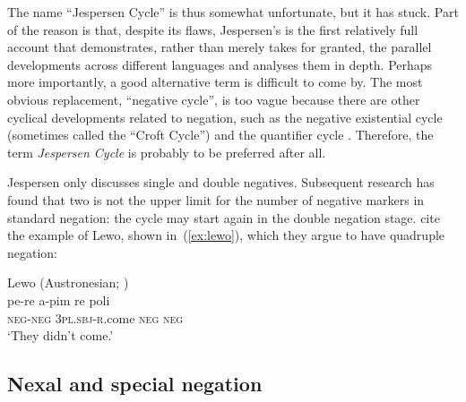 \documentclass[output=chapter]{langscibook}
\begin{document}
The name ``Jespersen Cycle'' is thus somewhat unfortunate, but it has stuck. Part of the reason is that, despite its flaws, Jespersen’s is the first relatively full account that demonstrates, rather than merely takes for granted, the parallel developments across different languages and analyses them in depth. Perhaps more importantly, a good alternative term is difficult to come by. The most obvious replacement, ``negative cycle'', is too vague because there are other cyclical developments related to negation, such as the negative existential cycle (sometimes called the ``Croft Cycle'') and the quantifier cycle \citep{Croft1991,Hansen2012,AuweraKrasnoukhovaVossen2022}. Therefore, the term \textit{Jespersen Cycle} is probably to be preferred after all.

Jespersen only discusses single and double negatives. Subsequent research has found that two is not the upper limit for the number of negative markers in standard negation: the cycle may start again in the double negation stage. \citet{VossenAuwera2014} cite the example of Lewo, shown in~(\ref{ex:lewo}), which they argue to have quadruple negation:

\ea Lewo (Austronesian; \citealp[405]{Early1994})\label{ex:lewo} 
   \\\gll pe-re a-pim re poli\\
   \textsc{neg-neg} 3\textsc{pl.sbj-r}.come \textsc{neg} \textsc{neg}\\
   \glt `They didn’t come.'
\z
{}


\subsection{Nexal and special negation}
\label{sec:nexalSpecial}
\end{document}
